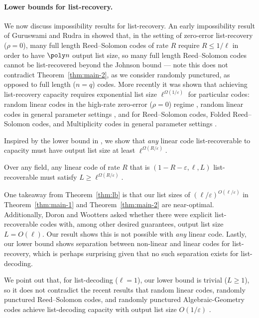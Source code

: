 \documentclass{article}
\begin{document}
\paragraph{Lower bounds for list-recovery.}
We now discuss impossibility results for list-recovery.
An early impossibility result of Guruswami and Rudra in \cite{guruswami2006limits} showed that, in the setting of zero-error list-recovery ($\rho=0$), many full length Reed--Solomon codes of rate $R$ require $R\le 1/\ell$ in order to have $\poly n$ output list size, so many full length Reed--Solomon codes cannot be list-recovered beyond the Johnson bound --- note this does not contradict Theorem~\ref{thm:main-2}, as we consider randomly punctured, as opposed to full length ($n=q$) codes.
More recently it was shown that achieving list-recovery capacity requires exponential list size $\ell^{\Omega(1/\varepsilon)}$ for particular codes: random linear codes in the high-rate zero-error ($\rho=0$) regime \cite{guruswami2021bounds}, random linear codes in general parameter settings \cite{levi2024random}, and for Reed--Solomon codes, Folded Reed--Solomon codes, and Multiplicity codes in general parameter settings \cite{chen2024explicit}. 

Inspired by the lower bound in \cite{chen2024explicit}, we show that \emph{any} linear code list-recoverable to capacity must have output list size at least $\ell^{\Omega(R/\varepsilon)}$. 
\begin{theorem}
Over any field, any linear code of rate $R$ that is $(1-R-\varepsilon, \ell,L)$ list-recoverable must satisfy $L\ge \ell^{\Omega(R/\varepsilon)}$.
\label{thm:lb}
\end{theorem}

One takeaway from Theorem~\ref{thm:lb} is that our list sizes of $(\ell/\varepsilon)^{O(\ell/\varepsilon)}$ in Theorem~\ref{thm:main-1} and Theorem~\ref{thm:main-2} are near-optimal.
Additionally, Doron and Wootters \cite{doron2020highprobability} asked whether there were explicit list-recoverable codes with, among other desired guarantees, output list size $L=O(\ell)$. Our result shows this is not possible with \emph{any} linear code.
Lastly, our lower bound shows separation between non-linear and linear codes for list-recovery, which is perhaps surprising given that no such separation exists for list-decoding.

We point out that, for list-decoding ($\ell=1$), our lower bound is trivial ($L\ge 1$), so it does not contradict the recent results that random linear codes, randomly punctured Reed--Solomon codes, and randomly punctured Algebraic-Geometry codes achieve list-decoding capacity with output list size $O(1/\varepsilon)$ \cite{brakensiek2023generic, guo2023randomly, AGL24, brakensiek2023ag}.
\end{document}
